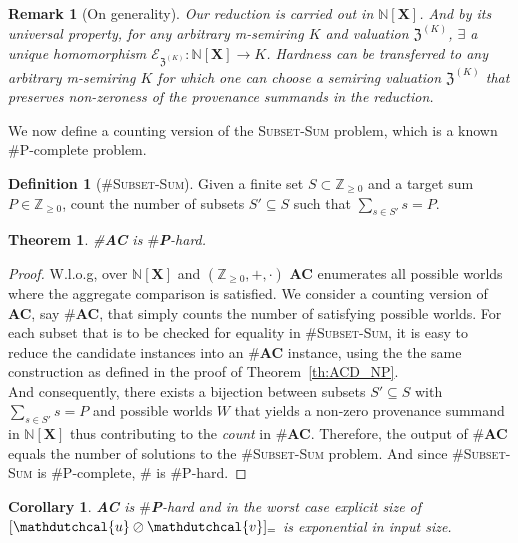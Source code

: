 \documentclass[10pt,a4paper]{scrartcl}
\newtheorem{theorem}{Theorem}[section]
\newtheorem{corollary}{Corollary}[theorem]
\newtheorem*{remark}{Remark}
\theoremstyle{definition}
\newtheorem{definition}{Definition}[section]
\theoremstyle{remark}
\begin{document}
\begin{remark}[On generality]
Our reduction is carried out in $\mathbb{N}[\mathbf{X}]$. And by its universal property, for any arbitrary m-semiring $K$ 
  and valuation $\mathfrak{Z}^{(K)}$, $\exists$ a unique homomorphism $\mathcal{E}_{\mathfrak{Z}^{(K)}}:\mathbb{N}[\mathbf{X}]\rightarrow K$. Hardness can be transferred 
  to any arbitrary m-semiring $K$ for which one can choose a semiring valuation $\mathfrak{Z}^{(K)}$ that preserves non-zeroness of the provenance summands in the reduction.
\end{remark}
We now define a counting version of the \textsc{Subset-Sum} problem, which is a known \#P-complete problem.
\begin{definition}[\#\textsc{Subset-Sum}]
  Given a finite set $S\subset\mathbb{Z}_{\geq 0}$ and a target sum $P\in\mathbb{Z}_{\geq 0}$, count the number of subsets $S'\subseteq S$ such that $\sum_{s\in S'}s = P$.
\end{definition}
\begin{theorem}
  \#\textbf{AC} is $\#$\textbf{P}-hard.
\end{theorem}
\begin{proof}
  W.l.o.g, over $\mathbb{N}[\mathbf{X}]$ and $(\mathbb{Z}_{\geq 0},+,\cdot)$ \textbf{AC} enumerates all possible worlds where the aggregate comparison is satisfied. 
  We consider a counting version of \textbf{AC}, say \#\textbf{AC}, that simply counts the number of satisfying possible worlds.
  For each subset that is to be checked for equality in \#\textsc{Subset-Sum}, it is easy to reduce the candidate instances into an \#\textbf{AC} instance, 
  using the the same construction as defined in the proof of Theorem~\ref{th:ACD_NP}.\\
  And consequently, there exists a bijection between subsets $S'\subseteq S$ with $\sum_{s\in S'} s =P$ and possible worlds $W$ that yields a non-zero provenance summand in $\mathbb{N}[\textbf{X}]$ thus contributing to the \textit{count} in \#\textbf{AC}. 
  Therefore, the output of \#\textbf{AC} equals the number of solutions to the \#\textsc{Subset-Sum} problem. And since  \#\textsc{Subset-Sum} is \#P-complete, \# is \#P-hard. 
\end{proof}
\begin{corollary}
  \textbf{AC} is $\#$\textbf{P}-hard and in the worst case explicit size of $[\mathdutchcal{u}\oslash\mathdutchcal{v}]_=$ is exponential in input size.
\end{corollary}
\end{document}
